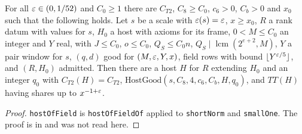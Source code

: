 \begin{lemma}\label{host:host-of-field}
For all $\varepsilon\in(0,1/52)$ and $C_0\ge1$ there are $C_{T2}$, $C_8\ge C_0$,
$c_6>0$, $C_b>0$ and $x_0$ such that the following holds. Let $s$ be a
scale with $\varepsilon(s)=\varepsilon$, $x\ge x_0$, $R$ a rank datum with values for $s$,
$H_0$ a host with axioms for its frame, $0<M\le C_0$ an integer and $Y$
real, with $J\le C_0$, $o\le C_0$, $Q_S\le C_0n$,
$Q_S\mid\operatorname{lcm}(2^{e+2},M)$, $Y$ a pair window for $s$, $(q,d)$
good for $(M,\varepsilon,Y,x)$, field rows with bound $\lfloor Y^{\varepsilon/5}\rfloor$,
and $(R,H_0)$ admitted. Then there are a host $H$ for $R$ extending $H_0$
and an integer $q_0$ with $C_{T2}(H)=C_{T2}$,
$\mathrm{HostGood}(s,C_8,4,c_6,C_b,H,q_0)$, and $TT(H)$ having shares up
to $x^{-1+\varepsilon}$.
\end{lemma}
\begin{proof}
\texttt{hostOfField} is \texttt{hostOfFieldOf} applied to \texttt{shortNorm}
and \texttt{smallOne}. The proof is in
 and
was not read here.
\end{proof}


